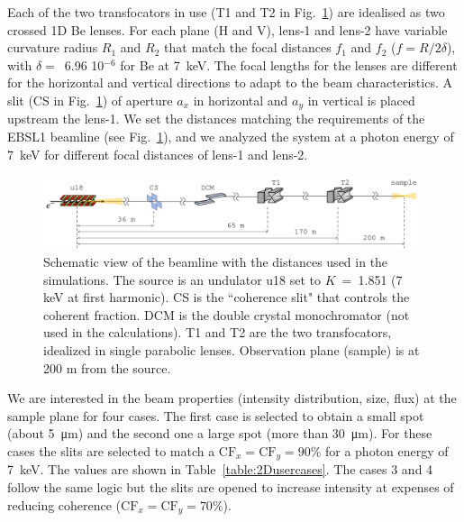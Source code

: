 \documentclass{iucr}              %
\begin{document}
Each of the two transfocators in use (T1 and T2 in Fig.~\ref{fig:beamline}) are idealised as two crossed 1D Be lenses. For each plane (H and V),
lens-1 and lens-2 have variable curvature radius $R_1$ and $R_2$ that match the focal distances $f_1$ and $f_2$ ($f=R/2\delta$), with $\delta=$~6.96 10$^{-6}$ for Be at \SI{7}{keV}. 
The focal lengths for the lenses are different for the horizontal and vertical directions to adapt to the beam characteristics.  
A slit (CS in Fig.~\ref{fig:beamline}) of aperture $a_x$ in horizontal and $a_y$ in vertical is placed upstream the lens-1. We set the distances matching the requirements of the EBSL1 beamline (see Fig.~\ref{fig:beamline}), and we analyzed the system at a photon energy of \SI{7}{keV} for different focal distances of lens-1 and lens-2. 
\onecolumn
\begin{figure}\label{fig:beamline}
    \includegraphics[width=0.99\textwidth]{figures/beamline.pdf}
    \caption{Schematic view of the beamline with the distances used in the simulations. The source is an undulator u18 set to $K$~=~1.851 (7 keV at first harmonic). CS is the ``coherence slit" that controls the coherent fraction. DCM is the double crystal monochromator (not used in the calculations). T1 and T2 are the two transfocators, idealized in single parabolic lenses. Observation plane (sample) is at 200 m from the source. 
    }
\end{figure}
\twocolumn

We are interested in the beam properties (intensity distribution, size, flux) at the sample plane for four cases.
The first case is selected to obtain a small spot (about \SI{5}{\micro\meter}) and the second one a large spot (more than \SI{30}{\micro\meter}). For these cases the slits are selected to match a $\text{CF}_{x}=\text{CF}_{y}=90\%$ for a photon energy of \SI{7}{keV}. The values are shown in Table~\ref{table:2Dusercases}. The cases 3 and 4 follow the same logic but the slits are opened to increase intensity at expenses of reducing coherence  ($\text{CF}_{x}=\text{CF}_{y}=70\%$). 
\end{document}
